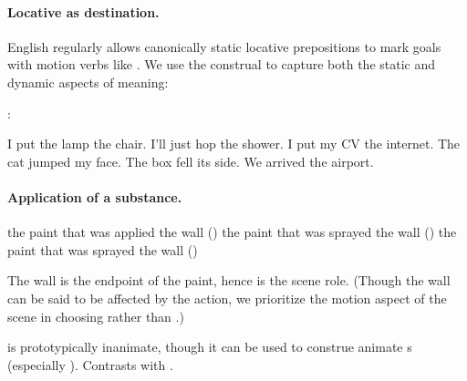 \paragraph{Locative as destination.}
English regularly allows canonically static locative prepositions to mark 
goals with motion verbs like .
We use the  construal to capture both the static and dynamic aspects of meaning:
\begin{exe}
  \ex{}: \begin{xlist}
    \ex I put the lamp  the chair.
    \ex I'll just hop  the shower.
    \ex I put my CV  the internet.
    \ex The cat jumped  my face.
    \ex The box fell  its side.
    \ex We arrived  the airport.
  \end{xlist}
\end{exe}

\paragraph{Application of a substance.}
\begin{xexe}
  \ex the paint that was applied  the wall ()
  \ex the paint that was sprayed  the wall ()
  \ex the paint that was sprayed  the wall () %
\end{xexe}
The wall is the endpoint of the paint, hence  is the scene role. 
(Though the wall can be said to be affected by the action, we prioritize 
the motion aspect of the scene in choosing  rather than .)


 is prototypically inanimate, though it can be used to construe animate s 
(especially ).
Contrasts with .

